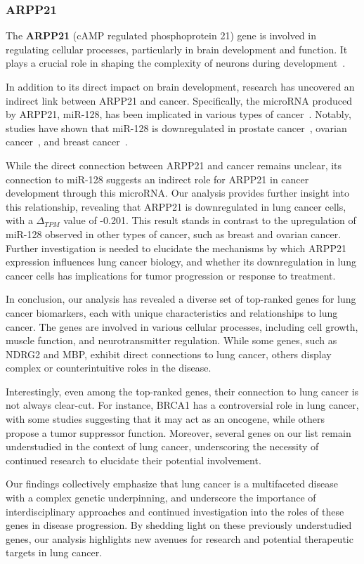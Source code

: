 \subsubsection*{ARPP21} \label{subsubsec:arpp21}
The \textbf{ARPP21} (cAMP regulated phosphoprotein 21) gene is involved in regulating cellular processes,
particularly in brain development and function.
It plays a crucial role in shaping the complexity of neurons during development~\cite{Rehfeld2018ARPP21}.

In addition to its direct impact on brain development, research has uncovered an indirect link between ARPP21 and cancer.
Specifically, the microRNA produced by ARPP21, miR-128, has been implicated in various types of cancer~\cite{Li2013ARPP21}.
Notably, studies have shown that miR-128 is downregulated in prostate cancer~\cite{Khan2010ARPP21}, ovarian cancer~\cite{Woo2012ARPP21},
and breast cancer~\cite{Zhu2011ARPP21}.

While the direct connection between ARPP21 and cancer remains unclear,
its connection to miR-128 suggests an indirect role for ARPP21 in cancer development through this microRNA.
Our analysis provides further insight into this relationship, revealing that ARPP21 is downregulated in lung cancer cells,
with a $\Delta_{TPM}$ value of -0.201.
This result stands in contrast to the upregulation of miR-128 observed in other types of cancer, such as breast and ovarian cancer.
Further investigation is needed to elucidate the mechanisms by which ARPP21 expression influences lung cancer biology,
and whether its downregulation in lung cancer cells has implications for tumor progression or response to treatment.
\newline


In conclusion, our analysis has revealed a diverse set of top-ranked genes for lung cancer biomarkers,
each with unique characteristics and relationships to lung cancer.
The genes are involved in various cellular processes, including cell growth, muscle function, and neurotransmitter regulation.
While some genes, such as NDRG2 and MBP, exhibit direct connections to lung cancer,
others display complex or counterintuitive roles in the disease.

Interestingly, even among the top-ranked genes, their connection to lung cancer is not always clear-cut.
For instance, BRCA1 has a controversial role in lung cancer, with some studies suggesting that it may act as an oncogene,
while others propose a tumor suppressor function.
Moreover, several genes on our list remain understudied in the context of lung cancer,
underscoring the necessity of continued research to elucidate their potential involvement.

Our findings collectively emphasize that lung cancer is a multifaceted disease with a complex genetic underpinning,
and underscore the importance of interdisciplinary approaches and continued investigation into the roles of these genes in disease progression.
By shedding light on these previously understudied genes, our analysis highlights new avenues for research and potential therapeutic targets in lung cancer.